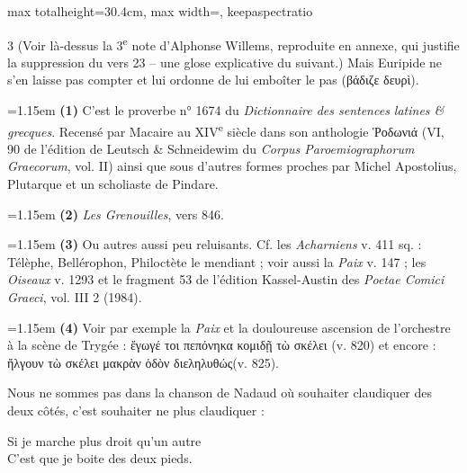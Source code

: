 \documentclass[11pt,twoside]{book}
\newcommand{\italique}[1]{\textit{#1}}
\newcommand{\citComm}[1]{\begin{quoting}[vskip=0.4pt,leftmargin=0.7em,rightmargin=0.2em]#1\end{quoting}}
\newcommand{\nieme}[1]{#1\textsuperscript{e}}
\begin{document}
\begin{adjustbox}{max totalheight=30.4cm, max width=\textwidth, keepaspectratio}
\begin{minipage}{\textwidth}
{\begin{multicols}{3}
\noindent (Voir là-dessus la \nieme{3} note d'Alphonse Willems, reproduite en annexe, qui justifie la suppression du vers 23 -- une glose explicative du suivant.) Mais Euripide ne s'en laisse pas compter et lui ordonne de lui emboîter le pas (βάδιζε δευρὶ).\\
\par\vspace{1.5pt}
\par\vspace{1.2pt}\par\nopagebreak\vspace{1pt}\noindent\hangindent=1.15em {\color{sepiaNote}\textbf{(1)}} C'est le proverbe n° 1674 du \italique{Dictionnaire des sentences latines \& grecques}. Recensé par Macaire au \nieme{XIV} siècle dans son anthologie Ῥοδωνιά (VI, 90 de l'édition de Leutsch \& Schneidewim du \italique{Corpus Paroemiographorum Graecorum}, vol. II) ainsi que sous d'autres formes proches par Michel Apostolius, Plutarque et un scholiaste de Pindare.
\par\vspace{1.5pt}
\noindent\hangindent=1.15em {\color{sepiaNote}\textbf{(2)}} \italique{Les Grenouilles}, vers 846.
\par\vspace{1.5pt}
\noindent\hangindent=1.15em {\color{sepiaNote}\textbf{(3)}} Ou autres aussi peu reluisants. Cf. les \italique{Acharniens} v. 411 sq. : Télèphe, Bellérophon, Philoctète le mendiant ; voir aussi la \italique{Paix} v. 147 ; les \italique{Oiseaux} v. 1293 et le fragment 53 de l'édition Kassel-Austin des \italique{Poetae Comici Graeci}, vol. III 2 (1984).
\par\vspace{1.5pt}
\noindent\hangindent=1.15em {\color{sepiaNote}\textbf{(4)}} Voir par exemple la \italique{Paix} et la douloureuse ascension de l'orchestre à la scène de Trygée : ἔγωγέ τοι πεπόνηκα κομιδῇ τὼ σκέλει (v. 820) et encore : ἤλγουν τὼ σκέλει μακρὰν ὁδὸν διεληλυθώς(v. 825).
\par\vspace{1.5pt}
\noindent Nous ne sommes pas dans la chanson de Nadaud où souhaiter claudiquer des deux côtés, c'est souhaiter ne plus claudiquer :
\citComm{Si je marche plus droit qu'un autre\\
C'est que je boite des deux pieds.}
\par\vspace{1.5pt}

\end{multicols}}
\end{minipage}
\end{adjustbox}
\end{document}
